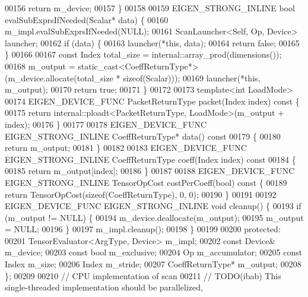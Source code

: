 \begin{DoxyCode}
00156     \textcolor{keywordflow}{return} m\_device;
00157   \}
00158 
00159   EIGEN\_STRONG\_INLINE \textcolor{keywordtype}{bool} evalSubExprsIfNeeded(Scalar* data) \{
00160     m\_impl.evalSubExprsIfNeeded(NULL);
00161     ScanLauncher<Self, Op, Device> launcher;
00162     \textcolor{keywordflow}{if} (data) \{
00163       launcher(*\textcolor{keyword}{this}, data);
00164       \textcolor{keywordflow}{return} \textcolor{keyword}{false};
00165     \}
00166 
00167     \textcolor{keyword}{const} Index total\_size = internal::array\_prod(dimensions());
00168     m\_output = \textcolor{keyword}{static\_cast<}CoeffReturnType*\textcolor{keyword}{>}(m\_device.allocate(total\_size * \textcolor{keyword}{sizeof}(Scalar)));
00169     launcher(*\textcolor{keyword}{this}, m\_output);
00170     \textcolor{keywordflow}{return} \textcolor{keyword}{true};
00171   \}
00172 
00173   \textcolor{keyword}{template}<\textcolor{keywordtype}{int} LoadMode>
00174   EIGEN\_DEVICE\_FUNC PacketReturnType packet(Index index)\textcolor{keyword}{ const }\{
00175     \textcolor{keywordflow}{return} internal::ploadt<PacketReturnType, LoadMode>(m\_output + index);
00176   \}
00177 
00178   EIGEN\_DEVICE\_FUNC EIGEN\_STRONG\_INLINE CoeffReturnType* data()\textcolor{keyword}{ const}
00179 \textcolor{keyword}{  }\{
00180     \textcolor{keywordflow}{return} m\_output;
00181   \}
00182 
00183   EIGEN\_DEVICE\_FUNC EIGEN\_STRONG\_INLINE CoeffReturnType coeff(Index index)\textcolor{keyword}{ const}
00184 \textcolor{keyword}{  }\{
00185     \textcolor{keywordflow}{return} m\_output[index];
00186   \}
00187 
00188   EIGEN\_DEVICE\_FUNC EIGEN\_STRONG\_INLINE TensorOpCost costPerCoeff(\textcolor{keywordtype}{bool})\textcolor{keyword}{ const }\{
00189     \textcolor{keywordflow}{return} TensorOpCost(\textcolor{keyword}{sizeof}(CoeffReturnType), 0, 0);
00190   \}
00191 
00192   EIGEN\_DEVICE\_FUNC EIGEN\_STRONG\_INLINE \textcolor{keywordtype}{void} cleanup() \{
00193     \textcolor{keywordflow}{if} (m\_output != NULL) \{
00194       m\_device.deallocate(m\_output);
00195       m\_output = NULL;
00196     \}
00197     m\_impl.cleanup();
00198   \}
00199 
00200 \textcolor{keyword}{protected}:
00201   TensorEvaluator<ArgType, Device> m\_impl;
00202   \textcolor{keyword}{const} Device& m\_device;
00203   \textcolor{keyword}{const} \textcolor{keywordtype}{bool} m\_exclusive;
00204   Op m\_accumulator;
00205   \textcolor{keyword}{const} Index m\_size;
00206   Index m\_stride;
00207   CoeffReturnType* m\_output;
00208 \};
00209 
00210 \textcolor{comment}{// CPU implementation of scan}
00211 \textcolor{comment}{// TODO(ibab) This single-threaded implementation should be parallelized,}

\end{DoxyCode}
